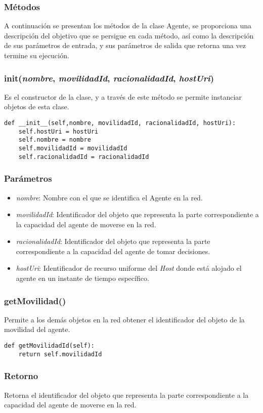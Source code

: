 \documentclass{article}
\begin{document}
\subsubsection*{Métodos}
A continuación se presentan los métodos de la clase Agente, se proporciona una descripción del objetivo que se persigue en cada método, así como la descripción de sus parámetros de entrada, y sus parámetros de salida que retorna una vez termine su ejecución.
\subsubsection{\textbf{init}(\textit{nombre}, \textit{movilidadId}, \textit{racionalidadId}, \textit{hostUri})}
Es el constructor de la clase, y a través de este método se permite instanciar objetos de esta clase.
\begin{lstlisting}
def __init__(self,nombre, movilidadId, racionalidadId, hostUri):
	self.hostUri = hostUri
	self.nombre = nombre
	self.movilidadId = movilidadId
	self.racionalidadId = racionalidadId
\end{lstlisting}
\subsubsection*{Parámetros}
\begin{itemize}
\item \textit{nombre}: Nombre con el que se identifica el Agente en la red.
\item \textit{movilidadId}: Identificador del objeto que representa la parte correspondiente a la capacidad del agente de moverse en la red.
\item \textit{racionalidadId}: Identificador del objeto que representa la parte correspondiente a la capacidad del agente de tomar decisiones.
\item \textit{hostUri}: Identificador de recurso uniforme del \textit{Host} donde está alojado el agente en un instante de tiempo específico.
\end{itemize}
\subsubsection{\textbf{getMovilidad}()}
Permite a los demás objetos en la red obtener el identificador del objeto de la movilidad del agente.
\begin{lstlisting}
def getMovilidadId(self):
	return self.movilidadId
\end{lstlisting}
\subsubsection*{Retorno}
Retorna el identificador del objeto que representa la parte correspondiente a la capacidad del agente de moverse en la red.
\end{document}
